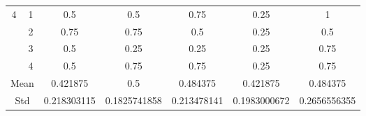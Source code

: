 \documentclass[draft,dvipsnames]{drexel-thesis}
\begin{document}
\begin{thesis}
\begin{table}[!t]
\begin{tabular}{|c|c|c|c|c|c|c|}
\multirow{4}{*}{4}    & 1                   & 0.5         & 0.5          & 0.75        & 0.25         & 1            \\ \cline{2-7}
                      & 2                   & 0.75        & 0.75         & 0.5         & 0.25         & 0.5          \\ \cline{2-7}
                      & 3                   & 0.5         & 0.25         & 0.25        & 0.25         & 0.75         \\ \cline{2-7}
                      & 4                   & 0.5         & 0.75         & 0.75        & 0.25         & 0.75         \\ \hline
\multicolumn{2}{|c|}{Mean}                  & 0.421875    & 0.5          & 0.484375    & 0.421875     & 0.484375     \\ \hline
\multicolumn{2}{|c|}{Std}                   & 0.218303115 & 0.1825741858 & 0.213478141 & 0.1983000672 & 0.2656556355 \\ \hline
\end{tabular}
\end{table}


\end{thesis}
\end{document}
